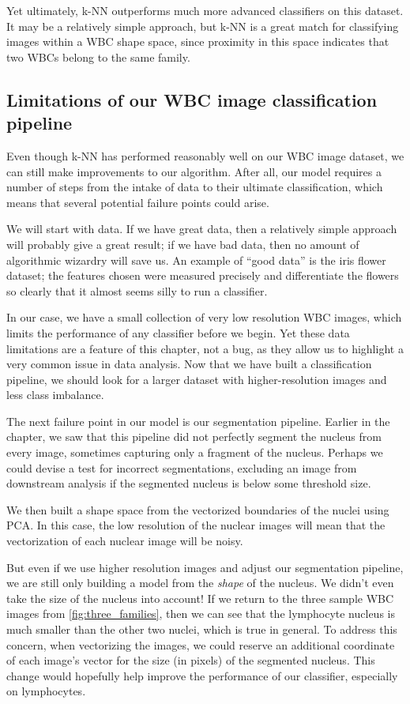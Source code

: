 Yet ultimately, k-NN outperforms much more advanced classifiers on this dataset. It may be a relatively simple approach, but k-NN is a great match for classifying images within a WBC shape space, since proximity in this space indicates that two WBCs belong to the same family.

\FloatBarrier
{}
\subsection{Limitations of our WBC image classification pipeline}

Even though k-NN has performed reasonably well on our WBC image dataset, we can still make improvements to our algorithm. After all, our model requires a number of steps from the intake of data to their ultimate classification, which means that several potential failure points could arise.

We will start with data. If we have great data, then a relatively simple approach will probably give a great result; if we have bad data, then no amount of algorithmic wizardry will save us. An example of ``good data'' is the iris flower dataset; the features chosen were measured precisely and differentiate the flowers so clearly that it almost seems silly to run a classifier.

In our case, we have a small collection of very low resolution WBC images, which limits the performance of any classifier before we begin. Yet these data limitations are a feature of this chapter, not a bug, as they allow us to highlight a very common issue in data analysis. Now that we have built a classification pipeline, we should look for a larger dataset with higher-resolution images and less class imbalance.

The next failure point in our model is our segmentation pipeline. Earlier in the chapter, we saw that this pipeline did not perfectly segment the nucleus from every image, sometimes capturing only a fragment of the nucleus. Perhaps we could devise a test for incorrect segmentations, excluding an image from downstream analysis if the segmented nucleus is below some threshold size.

We then built a shape space from the vectorized boundaries of the nuclei using PCA. In this case, the low resolution of the nuclear images will mean that the vectorization of each nuclear image will be noisy.

But even if we use higher resolution images and adjust our segmentation pipeline, we are still only building a model from the \textit{shape} of the nucleus. We didn't even take the size of the nucleus into account! If we return to the three sample WBC images from \autoref{fig:three_families}, then we can see that the lymphocyte nucleus is much smaller than the other two nuclei, which is true in general. To address this concern, when vectorizing the images, we could reserve an additional coordinate of each image's vector for the size (in pixels) of the segmented nucleus. This change would hopefully help improve the performance of our classifier, especially on lymphocytes.\\

